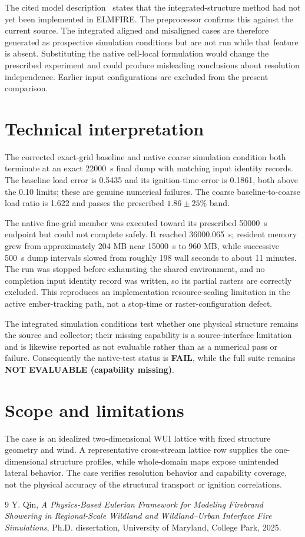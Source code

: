 The cited model description~\cite{Qin2025} states that the integrated-structure method
had not yet been implemented in ELMFIRE. The preprocessor confirms this against
the current source. The integrated aligned and misaligned cases are therefore
generated as prospective simulation conditions
but are not run while that feature is absent. Substituting the native
cell-local formulation would change the prescribed experiment and could
produce misleading conclusions about resolution independence. Earlier input
configurations are excluded from the present comparison.

\section{Technical interpretation}
The corrected exact-grid baseline and native coarse simulation condition both terminate at
an exact \SI{22000}{s} final dump with matching input identity records.  The baseline
load error is 0.5435 and its ignition-time error is 0.1861, both above the
0.10 limits; these are genuine numerical failures.  The coarse
baseline-to-coarse load ratio is 1.622 and passes the prescribed
\(1.86\pm25\%\) band.

The native fine-grid member was executed toward its prescribed
\SI{50000}{s} endpoint but could not complete safely.  It reached
\SI{36000.065}{s}; resident memory grew from approximately 204 MB near
\SI{15000}{s} to 960 MB, while successive \SI{500}{s} dump intervals slowed
from roughly 198 wall seconds to about 11 minutes.  The run was stopped before
exhausting the shared environment, and no completion input identity record was written,
so its partial rasters are correctly excluded.  This reproduces an
implementation resource-scaling limitation in the active ember-tracking path,
not a stop-time or raster-configuration defect.

The integrated simulation conditions test whether one physical structure remains the source
and collector; their missing capability is a source-interface limitation and
is likewise reported as not evaluable rather than as a numerical pass or
failure.  Consequently the native-test status is \textbf{FAIL}, while the full
suite remains \textbf{NOT EVALUABLE (capability missing)}.

\section{Scope and limitations}
The case is an idealized two-dimensional WUI lattice with fixed structure geometry and wind. A representative cross-stream lattice row supplies the one-dimensional structure profiles, while whole-domain maps expose unintended lateral behavior. The case verifies resolution behavior and capability coverage, not the physical accuracy of the structural transport or ignition correlations.

\begin{thebibliography}{9}
Y. Qin, \emph{A Physics-Based Eulerian Framework for Modeling Firebrand
Showering in Regional-Scale Wildland and Wildland--Urban Interface Fire
Simulations}, Ph.D. dissertation, University of Maryland, College Park, 2025.
\end{thebibliography}

